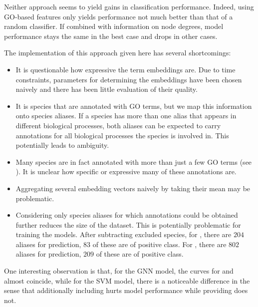 \documentclass[
	fontsize=10pt, %
	twoside=true, %
	secnumdepth=1, %
  toc=indentunnumbered %
]{kaobook}
\begin{document}
Neither approach seems to yield gains in classification performance. Indeed,
using GO-based features only yields performance not much better than that of a
random classifier. If combined with information on node degrees, model
performance stays the same in the best case and drops in other cases.

The implementation of this approach given here has several shortcomings:
\begin{itemize}
\item It is questionable how expressive the term embeddings are. Due to time
  constraints, parameters for
  determining the embeddings have been chosen naively and there has been little
  evaluation of their quality.
\item It is species that are annotated with GO terms, but we map this
  information onto species aliases. If a species has more than one alias that
  appears in different biological processes, both aliases can be expected to
  carry annotations for all biological processes the species is involved in.
  This potentially leads to ambiguity.
\item Many species are in fact annotated with more than just a few GO terms (see
  ). It is unclear how specific or expressive many of
  these annotations are.
\item Aggregating several embedding vectors naively by taking their mean may be problematic.
\item Considering only species aliases for which annotations could be obtained
  further reduces the size of the dataset. This is potentially problematic for
  training the models. After subtracting excluded species, for \ADLast, there
  are $204$ aliases for prediction, $83$ of these are of positive class. For
  \PDMap{}, there are $802$ aliases for prediction, $209$ of these are of positive class.
\end{itemize}

One interesting observation is that, for the GNN model, the curves for
 and  almost coincide, while for the SVM
model, there is a noticeable difference in the sense that additionally including
 hurts model performance while providing 
does not.



\end{document}
